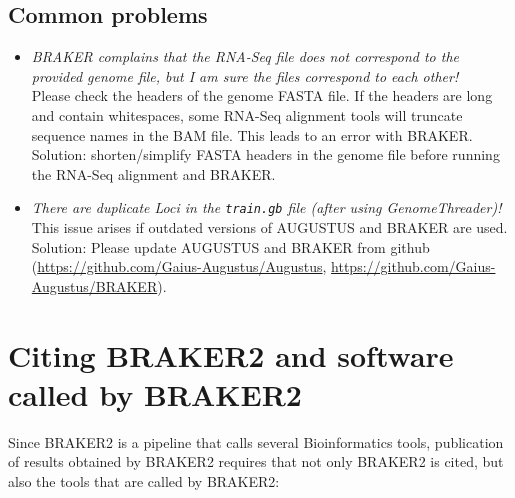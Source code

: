 \documentclass[]{article}
\begin{document}
\hypertarget{commonproblems}{\subsection{Common
problems}\label{commonproblems}}

\begin{itemize}
\item
  \emph{BRAKER complains that the RNA-Seq file does not correspond to
  the provided genome file, but I am sure the files correspond to each
  other!}\\
  Please check the headers of the genome FASTA file. If the headers are
  long and contain whitespaces, some RNA-Seq alignment tools will
  truncate sequence names in the BAM file. This leads to an error with
  BRAKER. Solution: shorten/simplify FASTA headers in the genome file
  before running the RNA-Seq alignment and BRAKER.
\item
  \emph{There are duplicate Loci in the \texttt{train.gb} file (after
  using GenomeThreader)!}\\
  This issue arises if outdated versions of AUGUSTUS and BRAKER are
  used. Solution: Please update AUGUSTUS and BRAKER from github
  (\url{https://github.com/Gaius-Augustus/Augustus},
  \url{https://github.com/Gaius-Augustus/BRAKER}).
\end{itemize}

\hypertarget{citing-braker2-and-software-called-by-braker2}{\section{Citing
BRAKER2 and software called by
BRAKER2}\label{citing-braker2-and-software-called-by-braker2}}

Since BRAKER2 is a pipeline that calls several Bioinformatics tools,
publication of results obtained by BRAKER2 requires that not only
BRAKER2 is cited, but also the tools that are called by BRAKER2:
\end{document}

